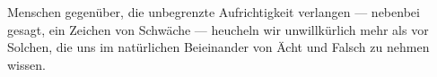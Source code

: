 Menschen gegenüber, die unbegrenzte Aufrichtigkeit verlangen — nebenbei gesagt, ein Zeichen von Schwäche — heucheln wir unwillkürlich mehr als vor Solchen, die uns im natürlichen Beieinander von Ächt und Falsch zu nehmen wissen.
\par

